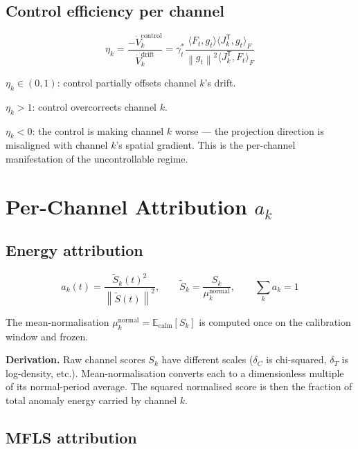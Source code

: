 \documentclass[11pt,a4paper]{article}
\theoremstyle{definition}
\newcommand{\E}{\mathbb{E}}
\newcommand{\T}{^{\mathsf{T}}}
\newcommand{\norm}[1]{\left\|#1\right\|}
\begin{document}
\subsection{Control efficiency per channel}

\begin{lockedbox}
\[
\eta_k = \frac{-\dot V_k^\mathrm{control}}{\dot V_k^\mathrm{drift}}
= \gamma^*_t\frac{\langle F_t,g_t\rangle\langle J_k\T,g_t\rangle_F}{\norm{g_t}^2\langle J_k\T,F_t\rangle_F}
\]
\end{lockedbox}

$\eta_k \in (0,1)$: control partially offsets channel $k$'s drift.

$\eta_k > 1$: control overcorrects channel $k$.

$\eta_k < 0$: the control is making channel $k$ worse — the projection direction
is misaligned with channel $k$'s spatial gradient. This is the per-channel
manifestation of the uncontrollable regime.

\section{Per-Channel Attribution $a_k$}

\subsection{Energy attribution}

\begin{lockedbox}
\[
a_k(t) = \frac{\tilde S_k(t)^2}{\norm{\tilde S(t)}^2}, \qquad \tilde S_k = \frac{S_k}{\mu_k^\mathrm{normal}}, \qquad \sum_k a_k = 1
\]
\end{lockedbox}

The mean-normalisation $\mu_k^\mathrm{normal} = \E_\mathrm{calm}[S_k]$ is computed once on
the calibration window and frozen.

\textbf{Derivation.}
Raw channel scores $S_k$ have different scales ($\delta_C$ is chi-squared,
$\delta_T$ is log-density, etc.). Mean-normalisation converts each to a dimensionless
multiple of its normal-period average. The squared normalised score is then
the fraction of total anomaly energy carried by channel $k$.

\subsection{MFLS attribution}
\end{document}
